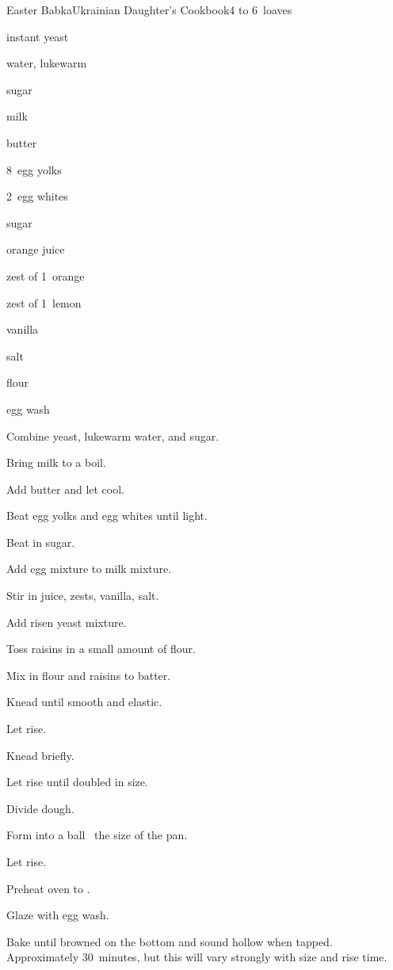 \begin{recipe}{Easter Babka}{Ukrainian Daughter's Cookbook}{4 to 6~loaves}

\begin{ingredients}
\item {} instant yeast
\item \C{\third} water, lukewarm
\item {} sugar
\item {} milk
\item \C{\half} butter
\item 8~egg yolks
\item 2~egg whites
\item {} sugar
\item \C{\half} orange juice
\item zest of 1~orange
\item zest of 1~lemon
\item {} vanilla
\item {} salt
\item {} flour
\item \C{\half} 
\item egg wash
\end{ingredients}

\begin{directions}
\item Combine yeast, lukewarm water, and  sugar.
\item Bring milk to a boil.
\item Add butter and let cool.
\item Beat egg yolks and egg whites until light.
\item Beat in sugar.
\item Add egg mixture to milk mixture.
\item Stir in juice, zests, vanilla, salt.
\item Add risen yeast mixture.
\item Toss raisins in a small amount of flour.
\item Mix in flour and raisins to batter.
\item Knead until smooth and elastic.
\item Let rise.
\item Knead briefly.
\item Let rise until doubled in size.
\item Divide dough.
\item Form into a ball \third~the size of the pan.
\item Let rise.
\item Preheat oven to .
\item Glaze with egg wash.
\item Bake until browned on the bottom and sound hollow when tapped. Approximately 30~minutes, but this will vary strongly with size and rise time.
\end{directions}

\end{recipe}
